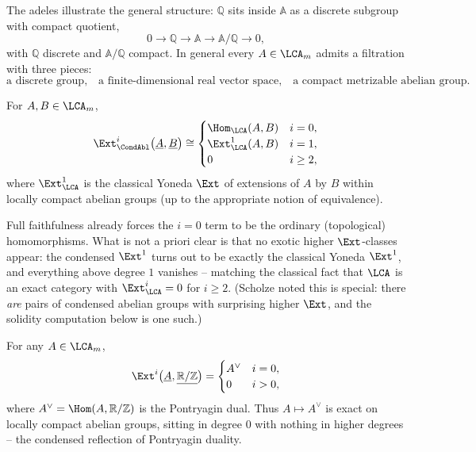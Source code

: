 The adeles illustrate the general structure: $\mathbb{Q}$ sits inside $\mathbb{A}$
as a discrete subgroup with compact quotient,
\begin{equation*}
0\to\mathbb{Q}\to\mathbb{A}\to\mathbb{A}/\mathbb{Q}\to0,
\end{equation*}
with $\mathbb{Q}$ discrete and $\mathbb{A}/\mathbb{Q}$ compact. In general every
$A\in\LCA_m$ admits a filtration with three pieces:
\begin{equation}
\label{eq:4:lca-filtration}
\text{a discrete group,}\quad
\text{a finite-dimensional real vector space,}\quad
\text{a compact metrizable abelian group.}
\end{equation}

\begin{theorem}
\label{thm:4:lca-ext}
For $A,B\in\LCA_m$,
\begin{equation*}
\Ext^{i}_{\CondAbl}\bigl(\underline{A},\underline{B}\bigr)\cong
\begin{cases}
\Hom_{\LCA}(A,B) & i=0,\\
\Ext^{1}_{\LCA}(A,B) & i=1,\\
0 & i\geq2,
\end{cases}
\end{equation*}
where $\Ext^{1}_{\LCA}$ is the classical Yoneda $\Ext$ of extensions of $A$ by
$B$ within locally compact abelian groups (up to the appropriate notion of
equivalence).
\end{theorem}

Full faithfulness already forces the $i=0$ term to be the ordinary
(topological) homomorphisms. What is not a priori clear is that no exotic higher
$\Ext$-classes appear: the condensed $\Ext^1$ turns out to be exactly the
classical Yoneda $\Ext^1$, and everything above degree $1$ vanishes -- matching
the classical fact that $\LCA$ is an exact category with $\Ext^i_{\LCA}=0$ for
$i\geq2$. (Scholze noted this is special: there \emph{are} pairs of condensed
abelian groups with surprising higher $\Ext$, and the solidity computation below
is one such.)

\begin{example}
\label{ex:4:pontryagin}
For any $A\in\LCA_m$,
\begin{equation*}
\Ext^{i}\bigl(\underline{A},\underline{\mathbb{R}/\mathbb{Z}}\bigr)=
\begin{cases}
A^{\vee} & i=0,\\
0 & i>0,
\end{cases}
\end{equation*}
where $A^{\vee}=\Hom(A,\mathbb{R}/\mathbb{Z})$ is the Pontryagin dual. Thus
$A\mapsto A^{\vee}$ is exact on locally compact abelian groups, sitting in degree
$0$ with nothing in higher degrees -- the condensed reflection of Pontryagin
duality.
\end{example}

